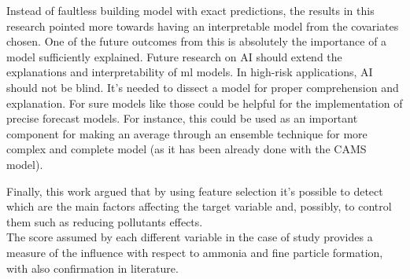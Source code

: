 Instead of faultless building model with exact predictions, the results in this research pointed more towards having an interpretable model from the covariates chosen. 
One of the future outcomes from this is absolutely the importance of a model sufficiently explained.
Future research on AI should extend the explanations and interpretability of \acrshort{ml} models.
In high-risk applications, AI should not be blind. 
It's needed to dissect a model for proper comprehension and explanation.
For sure models like those could be helpful for the implementation of precise forecast models.  
For instance, this could be used as an important component for making an average through an ensemble technique for more complex and complete model (as it has been already done with the CAMS model).
\par
Finally, this work argued that by using feature selection it's possible to detect which are the main factors affecting the target variable and, possibly, to control them such as reducing pollutants effects.\\
The score assumed by each different variable in the case of study provides a measure of the influence with respect to ammonia and fine particle formation, with also confirmation in literature.
\begin{comment}
Looking forward, further attempts for reducing pollutant formation should be made by procedures actually used.
\end{comment}
